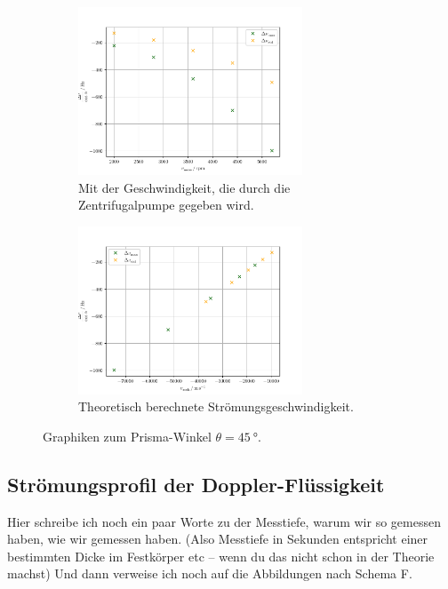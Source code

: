 \begin{figure}
    \centering
    \begin{subfigure}{0.48\textwidth}
        \centering
        \includegraphics[height=5.0cm]{plots/45_2.pdf}
        \caption{Mit der Geschwindigkeit, die durch die Zentrifugalpumpe gegeben wird.}
        \label{fig:exp45}
    \end{subfigure}
    \begin{subfigure}{0.48\textwidth}
        \centering
        \includegraphics[height=5.0cm]{plots/45_1.pdf}
        \caption{Theoretisch berechnete Strömungsgeschwindigkeit.}
        \label{fig:theo45}
    \end{subfigure}
    \caption{Graphiken zum Prisma-Winkel $\theta=\SI{45}{\degree}$.}
    \label{fig:45}
\end{figure}

\subsection{Strömungsprofil der Doppler-Flüssigkeit}

Hier schreibe ich noch ein paar Worte zu der Messtiefe, warum wir so gemessen haben, wie wir gemessen haben. 
(Also Messtiefe in Sekunden entspricht einer bestimmten Dicke im Festkörper etc -- wenn du das nicht schon in der Theorie machst)
Und dann verweise ich noch auf die Abbildungen nach Schema F. 

